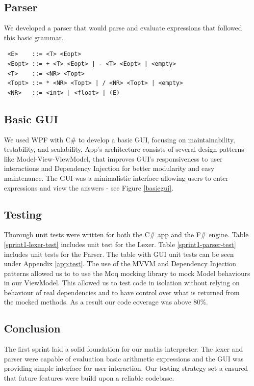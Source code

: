\documentclass[a4paper, oneside, 11pt]{report}
\begin{document}
\subsection{Parser}
We developed a parser that would parse and evaluate expressions that followed this basic grammar.
\begin{verbatim}
 <E>    ::= <T> <Eopt>
 <Eopt> ::= + <T> <Eopt> | - <T> <Eopt> | <empty>
 <T>    ::= <NR> <Topt>
 <Topt> ::= * <NR> <Topt> | / <NR> <Topt> | <empty>
 <NR>   ::= <int> | <float> | (E)
\end{verbatim}

\subsection{Basic GUI}
We used WPF\cite{WPF:2023} with C\# to develop a basic GUI, focusing on maintainability, testability, and scalability. App's architecture consists of several design patterns like Model-View-ViewModel\cite{MVVM:2022}, that improves GUI's responsiveness to user interactions and Dependency Injection\cite{DI:2023} for better modularity and easy maintenance. The GUI was a minimalistic interface allowing users to enter expressions and view the answers - see Figure \ref{basicgui}.

\subsection{Testing}
Thorough unit tests were written for both the C\# app and the F\# engine. Table \ref{sprint1-lexer-test} includes unit test for the Lexer. Table \ref{sprint1-parser-test} includes unit tests for the Parser. The table with GUI unit tests can be seen under Appendix \ref{app:test}. The use of the MVVM and Dependency Injection patterns allowed us to to use the Moq\cite{Moq} mocking library to mock Model behaviours in our ViewModel. This allowed us to test code in isolation without relying on behaviour of real dependencies and to have control over what is returned from the mocked methods. As a result our code coverage was above 80\%.

\subsection{Conclusion}
The first sprint laid a solid foundation for our maths interpreter. The lexer and parser were capable of evaluation basic arithmetic expressions and the GUI was providing simple interface for user interaction. Our testing strategy set a ensured that future features were build upon a reliable codebase. 
\end{document}
